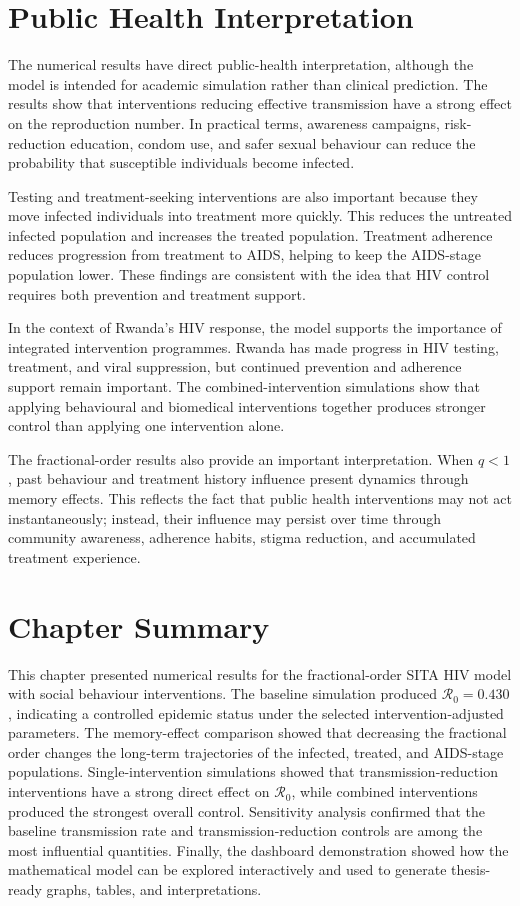 \documentclass[12pt,a4paper,oneside]{report}
\begin{document}
\section{Public Health Interpretation}
The numerical results have direct public-health interpretation, although the model is intended for academic simulation rather than clinical prediction. The results show that interventions reducing effective transmission have a strong effect on the reproduction number. In practical terms, awareness campaigns, risk-reduction education, condom use, and safer sexual behaviour can reduce the probability that susceptible individuals become infected.

Testing and treatment-seeking interventions are also important because they move infected individuals into treatment more quickly. This reduces the untreated infected population and increases the treated population. Treatment adherence reduces progression from treatment to AIDS, helping to keep the AIDS-stage population lower. These findings are consistent with the idea that HIV control requires both prevention and treatment support.

In the context of Rwanda's HIV response, the model supports the importance of integrated intervention programmes. Rwanda has made progress in HIV testing, treatment, and viral suppression, but continued prevention and adherence support remain important. The combined-intervention simulations show that applying behavioural and biomedical interventions together produces stronger control than applying one intervention alone.

The fractional-order results also provide an important interpretation. When $q<1$, past behaviour and treatment history influence present dynamics through memory effects. This reflects the fact that public health interventions may not act instantaneously; instead, their influence may persist over time through community awareness, adherence habits, stigma reduction, and accumulated treatment experience.

\section{Chapter Summary}
This chapter presented numerical results for the fractional-order SITA HIV model with social behaviour interventions. The baseline simulation produced $\mathcal{R}_0=0.430$, indicating a controlled epidemic status under the selected intervention-adjusted parameters. The memory-effect comparison showed that decreasing the fractional order changes the long-term trajectories of the infected, treated, and AIDS-stage populations. Single-intervention simulations showed that transmission-reduction interventions have a strong direct effect on $\mathcal{R}_0$, while combined interventions produced the strongest overall control. Sensitivity analysis confirmed that the baseline transmission rate and transmission-reduction controls are among the most influential quantities. Finally, the dashboard demonstration showed how the mathematical model can be explored interactively and used to generate thesis-ready graphs, tables, and interpretations.
\end{document}
